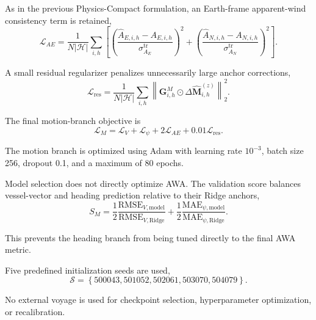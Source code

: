 As in the previous Physics-Compact formulation, an Earth-frame apparent-wind consistency term is retained,
\begin{equation}
\mathcal L_{AE}
=
\frac{1}{
N
\left|
\mathcal H
\right|
}
\sum_{i,h}
\left[
\left(
\frac{
\hat A_{E,i,h}
-
A_{E,i,h}
}{
\sigma^{\mathrm{tr}}_{A_E}
}
\right)^2
+
\left(
\frac{
\hat A_{N,i,h}
-
A_{N,i,h}
}{
\sigma^{\mathrm{tr}}_{A_N}
}
\right)^2
\right].
\label{eq:apparent_loss}
\end{equation}

A small residual regularizer penalizes unnecessarily large anchor corrections,
\begin{equation}
\mathcal L_{\mathrm{res}}
=
\frac{1}{
N
\left|
\mathcal H
\right|
}
\sum_{i,h}
\left\|
\mathbf G^M_{i,h}
\odot
\Delta\hat{\mathbf M}^{(z)}_{i,h}
\right\|_2^2.
\label{eq:residual_regularization}
\end{equation}

The final motion-branch objective is
\begin{equation}
\boxed{
\mathcal L_M
=
\mathcal L_V
+
\mathcal L_\psi
+
2\mathcal L_{AE}
+
0.01\mathcal L_{\mathrm{res}}
}.
\label{eq:motion_total_loss}
\end{equation}

The motion branch is optimized using Adam with learning rate $10^{-3}$, batch size 256, dropout 0.1, and a maximum of 80 epochs.

Model selection does not directly optimize AWA. The validation score balances vessel-vector and heading prediction relative to their Ridge anchors,
\begin{equation}
S_M
=
\frac{1}{2}
\frac{
\mathrm{RMSE}_{V,\mathrm{model}}
}{
\mathrm{RMSE}_{V,\mathrm{Ridge}}
}
+
\frac{1}{2}
\frac{
\mathrm{MAE}_{\psi,\mathrm{model}}
}{
\mathrm{MAE}_{\psi,\mathrm{Ridge}}
}.
\label{eq:motion_validation_score}
\end{equation}

This prevents the heading branch from being tuned directly to the final AWA metric.

Five predefined initialization seeds are used,
\begin{equation}
\mathcal S
=
\left\{
500043,
501052,
502061,
503070,
504079
\right\}.
\label{eq:seed_set}
\end{equation}

No external voyage is used for checkpoint selection, hyperparameter optimization, or recalibration.

